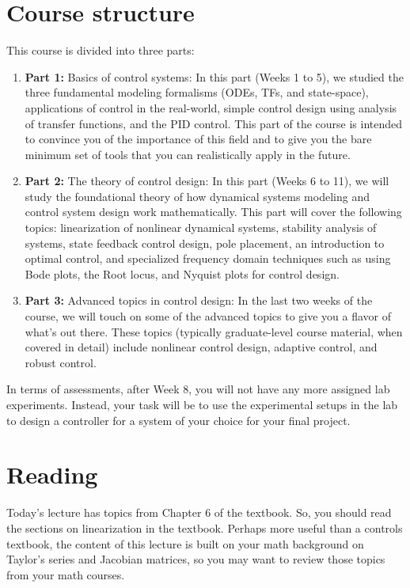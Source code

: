 \documentclass{ee122_notes}
\begin{document}
\section{Course structure}
This course is divided into three parts: 
\begin{enumerate}
\item \textbf{Part 1:} Basics of control systems: In this part (Weeks 1 to 5), we studied the three fundamental modeling formalisms (ODEs, TFs, and state-space), applications of control in the real-world, simple control design using analysis of transfer functions, and the PID control. This part of the course is intended to convince you of the importance of this field and to give you the bare minimum set of tools that you can realistically apply in the future.
\item \textbf{Part 2:} The theory of control design: In this part (Weeks 6 to 11), we will study the foundational theory of how dynamical systems modeling and control system design work mathematically. This part will cover the following topics: linearization of nonlinear dynamical systems, stability analysis of systems, state feedback control design, pole placement, an introduction to optimal control, and specialized frequency domain techniques such as using Bode plots, the Root locus, and Nyquist plots for control design. 
\item \textbf{Part 3:} Advanced topics in control design: In the last two weeks of the course, we will touch on some of the advanced topics to give you a flavor of what's out there. These topics (typically graduate-level course material, when covered in detail) include nonlinear control design, adaptive control, and robust control.
\end{enumerate}
In terms of assessments, after Week 8, you will not have any more assigned lab experiments. Instead, your task will be to use the experimental setups in the lab to design a controller for a system of your choice for your final project. 

\section{Reading}
Today's lecture has topics from Chapter 6 of the textbook. So, you should read the sections on linearization in the textbook. Perhaps more useful than a controls textbook, the content of this lecture is built on your math background on Taylor's series and Jacobian matrices, so you may want to review those topics from your math courses.
\end{document}
